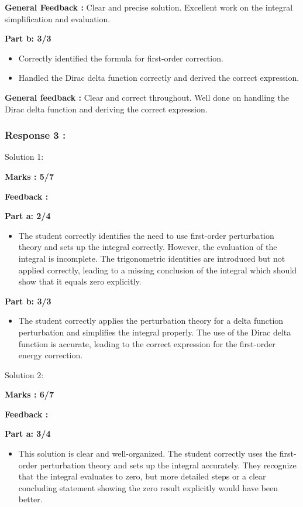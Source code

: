 \documentclass[a4paper,11pt]{article}
\begin{document}
\textbf{General Feedback :}
Clear and precise solution. Excellent work on the integral simplification and evaluation.

\textbf{Part b: 3/3}
\begin{itemize}
    \item Correctly identified the formula for first-order correction.
    \item Handled the Dirac delta function correctly and derived the correct expression.
\end{itemize}

\textbf{General feedback :}
Clear and correct throughout. Well done on handling the Dirac delta function and deriving the correct expression.



\subsubsection*{Response 3 :}


Solution 1:


\textbf{ Marks : 5/7}

\textbf{Feedback :}

\textbf{Part a: 2/4}

\begin{itemize}
    \item The student correctly identifies the need to use first-order perturbation theory and sets up the integral correctly. However, the evaluation of the integral is incomplete. The trigonometric identities are introduced but not applied correctly, leading to a missing conclusion of the integral which should show that it equals zero explicitly.
\end{itemize}

\textbf{Part b: 3/3}
\begin{itemize}
    \item The student correctly applies the perturbation theory for a delta function perturbation and simplifies the integral properly. The use of the Dirac delta function is accurate, leading to the correct expression for the first-order energy correction.
\end{itemize}



Solution 2:


\textbf{ Marks : 6/7}

\textbf{Feedback :}

\textbf{Part a: 3/4}

\begin{itemize}
    \item This solution is clear and well-organized. The student correctly uses the first-order perturbation theory and sets up the integral accurately. They recognize that the integral evaluates to zero, but more detailed steps or a clear concluding statement showing the zero result explicitly would have been better.
\end{itemize}
\end{document}
